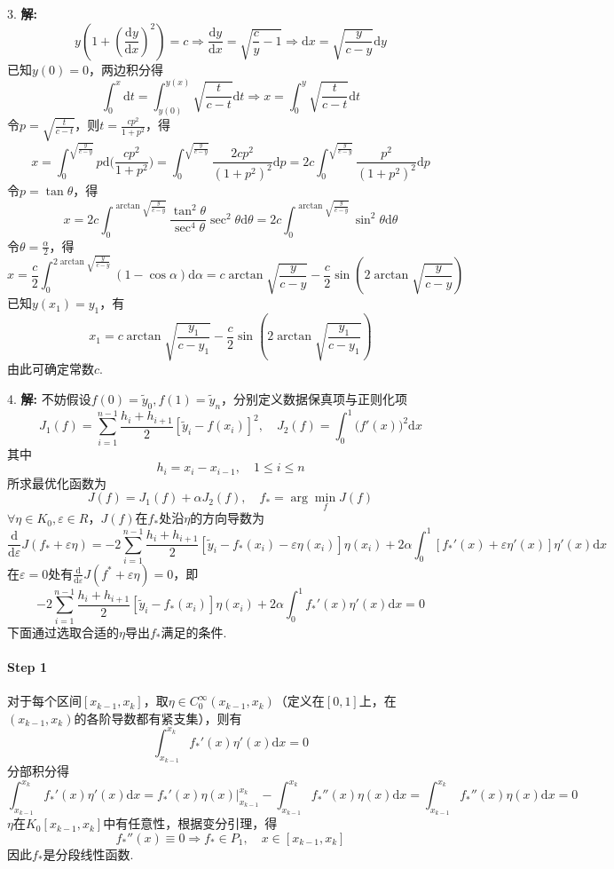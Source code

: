 \documentclass[12pt, a4paper]{article}
\theoremstyle{margin}
\begin{document}
3. \textbf{解: }
\[y(1 + (\frac{\mathrm{d}y}{\mathrm{d}x})^2) = c \Rightarrow \frac{\mathrm{d}y}{\mathrm{d}x} = \sqrt{\frac{c}{y} - 1} \Rightarrow \mathrm{d}x = \sqrt{\frac{y}{c - y}} \mathrm{d}y\]
已知$y(0) = 0$，两边积分得
\[\int_{0}^{x} \mathrm{d}t = \int_{y(0)}^{y(x)} \sqrt{\frac{t}{c - t}} \mathrm{d}t \Rightarrow x = \int_{0}^{y}\sqrt{\frac{t}{c-t}} \mathrm{d}t\]
令$p = \sqrt{\frac{t}{c - t}}$，则$t = \frac{cp^2}{1 + p^2}$，得
\[x = \int_{0}^{\sqrt{\frac{y}{c - y}}} p \mathrm{d}\Big(\frac{cp^2}{1 + p^2}\Big) = \int_{0}^{\sqrt{\frac{y}{c - y}}} \frac{2cp^2}{(1 + p^2)^2} \mathrm{d}p = 2c \int_{0}^{\sqrt{\frac{y}{c - y}}} \frac{p^2}{(1 + p^2)^2} \mathrm{d}p\]
令$p = \tan \theta$，得
\[x = 2c \int_{0}^{\arctan \sqrt{\frac{y}{c - y}}} \frac{\tan^2 \theta}{\sec^4 \theta} \sec^2 \theta \mathrm{d}\theta = 2c \int_{0}^{\arctan \sqrt{\frac{y}{c - y}}} \sin^2 \theta \mathrm{d}\theta\]
令$\theta = \frac{\alpha}{2}$，得
\[x = \frac{c}{2} \int_{0}^{2 \arctan{\sqrt{\frac{y}{c - y}}}} (1 - \cos \alpha) \mathrm{d}\alpha = c \arctan{\sqrt{\frac{y}{c - y}}} - \frac{c}{2}\sin{(2\arctan{\sqrt{\frac{y}{c - y}}})}\]
已知$y(x_1) = y_1$，有
\[x_1 = c \arctan{\sqrt{\frac{y_1}{c - y_1}}} - \frac{c}{2}\sin{(2\arctan{\sqrt{\frac{y_1}{c - y_1}}})}\]
由此可确定常数$c$.
\newline

4. \textbf{解: } 不妨假设$f(0) = \tilde y_0, f(1) = \tilde y_n$，分别定义数据保真项与正则化项
\[J_1(f) = \sum_{i = 1}^{n - 1} \frac{h_{i} + h_{i + 1}}{2}[\tilde y_i - f(x_i)]^2, \quad J_2(f) = \int_{0}^{1} \big(f'(x)\big)^2 \mathrm{d}x\]
其中
\[h_i = x_i - x_{i - 1}, \quad 1 \le i \le n\]
所求最优化函数为
\[J(f) = J_1(f) + \alpha J_2(f), \quad f_* = \arg \min_{f} J(f)\]
$\forall \eta \in K_0, \varepsilon \in R$，$J(f)$在$f_*$处沿$\eta$的方向导数为
\[\frac{\mathrm{d}}{\mathrm{d}\varepsilon}J(f_* + \varepsilon\eta) = -2 \sum_{i = 1}^{n - 1} \frac{h_{i} + h_{i + 1}}{2}[\tilde y_i - f_*(x_i) - \varepsilon\eta(x_i)]\eta(x_i) + 2\alpha \int_{0}^{1} [f_*'(x) + \varepsilon\eta'(x)]\eta'(x) \mathrm{d}x\]
在$\varepsilon = 0$处有$\frac{\mathrm{d}}{\mathrm{d}\varepsilon}J(f^* + \varepsilon\eta) = 0$，即
\[-2 \sum_{i = 1}^{n - 1} \frac{h_{i} + h_{i + 1}}{2}[\tilde y_i - f_*(x_i)]\eta(x_i) + 2\alpha \int_{0}^{1} f_*'(x)\eta'(x) \mathrm{d}x = 0\]
下面通过选取合适的$\eta$导出$f_*$满足的条件.
\paragraph{Step 1} 对于每个区间$[x_{k - 1}, x_k]$，取$\eta \in C_{0}^{\infty}(x_{k - 1}, x_k)$（定义在$[0, 1]$上，在$(x_{k - 1}, x_k)$的各阶导数都有紧支集），则有
\[\int_{x_{k - 1}}^{x_{k}} f_*'(x)\eta'(x) \mathrm{d}x = 0\]
分部积分得
\[\int_{x_{k - 1}}^{x_{k}} f_*'(x)\eta'(x) \mathrm{d}x = f_*'(x)\eta(x) \bigg|_{x_{k-1}}^{x_{k}} - \int_{x_{k - 1}}^{x_{k}} f_*''(x)\eta(x) \mathrm{d}x = \int_{x_{k - 1}}^{x_{k}} f_*''(x)\eta(x) \mathrm{d}x = 0\]
$\eta$在$K_0[x_{k - 1}, x_{k}]$中有任意性，根据变分引理，得
\[f_*''(x) \equiv 0 \Rightarrow f_* \in P_1, \quad x \in [x_{k - 1}, x_{k}]\]
因此$f_*$是分段线性函数. 
\end{document}

